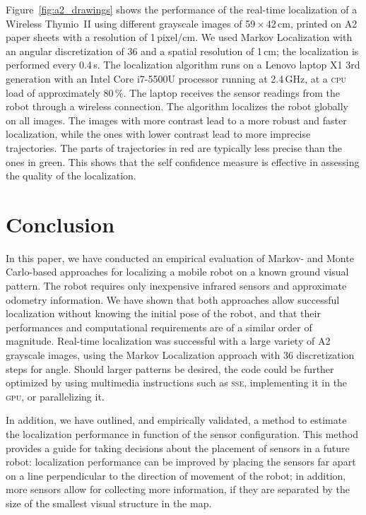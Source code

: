 \documentclass[letterpaper, 10pt, conference]{ieeeconf}
\newcommand{\Fig}[1]{Figure~\ref{fig:#1}}
\begin{document}
\Fig{a2_drawings} shows the performance of the real-time localization of a Wireless Thymio~II using different grayscale images of 59\,$\times$\,42\,cm, printed on A2 paper sheets with a resolution of 1\,pixel/cm.
We used Markov Localization with an angular discretization of 36 and a spatial resolution of 1\,cm; the localization is performed every 0.4\,s.
The localization algorithm runs on a Lenovo laptop X1 3rd generation with an Intel Core i7-5500U processor running at 2.4\,GHz, at a \textsc{cpu} load of approximately 80\,\%.
The laptop receives the sensor readings from the robot through a wireless connection.
The algorithm localizes the robot globally on all images.
The images with more contrast lead to a more robust and faster localization, while the ones with lower contrast lead to more imprecise trajectories.
The parts of trajectories in red are typically less precise than the ones in green.
This shows that the self confidence measure is effective in assessing the quality of the localization.

\section{Conclusion}

In this paper, we have conducted an empirical evaluation of Markov- and Monte Carlo-based approaches for localizing a mobile robot on a known ground visual pattern.
The robot requires only inexpensive infrared sensors and approximate odometry information.
We have shown that both approaches allow successful localization without knowing the initial pose of the robot, and that their performances and computational requirements are of a similar order of magnitude.
Real-time localization was successful with a large variety of A2 grayscale images, using the Markov Localization approach with 36 discretization steps for angle.
Should larger patterns be desired, the code could be further optimized by using multimedia instructions such as \textsc{sse}, implementing it in the \textsc{gpu}, or parallelizing it.

In addition, we have outlined, and empirically validated, a method to estimate the localization performance in function of the sensor configuration.
This method provides a guide for taking decisions about the placement of sensors in a future robot:
localization performance can be improved by placing the sensors far apart on a line perpendicular to the direction of movement of the robot; in addition, more sensors allow for collecting more information, if they are separated by the size of the smallest visual structure in the map.
\end{document}
